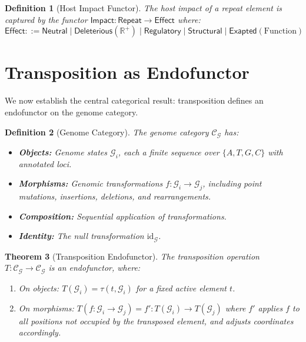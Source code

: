 \documentclass[12pt,a4paper]{article}
\newtheorem{theorem}{Theorem}[section]
\newtheorem{definition}[theorem]{Definition}
\newcommand{\Genome}{\mathcal{G}}
\newcommand{\Repeat}{\mathsf{Repeat}}
\newcommand{\id}{\mathrm{id}}
\begin{document}
\begin{definition}[Host Impact Functor]\label{def:impact}
The \emph{host impact} of a repeat element is captured by the functor
$\mathsf{Impact} : \Repeat \to \mathsf{Effect}$ where:
\[
\mathsf{Effect} ::= \mathsf{Neutral} \mid \mathsf{Deleterious}(\mathbb{R}^+)
  \mid \mathsf{Regulatory} \mid \mathsf{Structural} \mid \mathsf{Exapted}(\mathrm{Function})
\]
\end{definition}


\section{Transposition as Endofunctor}\label{sec:endofunctor}

We now establish the central categorical result: transposition defines an endofunctor
on the genome category.

\begin{definition}[Genome Category]\label{def:genome-cat}
The \emph{genome category} $\mathcal{C}_\Genome$ has:
\begin{itemize}
  \item \textbf{Objects:} Genome states $\Genome_i$, each a finite sequence over $\{A,T,G,C\}$
    with annotated loci.
  \item \textbf{Morphisms:} Genomic transformations $f : \Genome_i \to \Genome_j$, including
    point mutations, insertions, deletions, and rearrangements.
  \item \textbf{Composition:} Sequential application of transformations.
  \item \textbf{Identity:} The null transformation $\id_\Genome$.
\end{itemize}
\end{definition}

\begin{theorem}[Transposition Endofunctor]\label{thm:endofunctor}
The transposition operation $T : \mathcal{C}_\Genome \to \mathcal{C}_\Genome$ is an
endofunctor, where:
\begin{enumerate}[label=(\roman*)]
  \item On objects: $T(\Genome_i) = \tau(t, \Genome_i)$ for a fixed active element $t$.
  \item On morphisms: $T(f : \Genome_i \to \Genome_j) = f' : T(\Genome_i) \to T(\Genome_j)$
    where $f'$ applies $f$ to all positions not occupied by the transposed element, and
    adjusts coordinates accordingly.
\end{enumerate}
\end{theorem}
\end{document}

